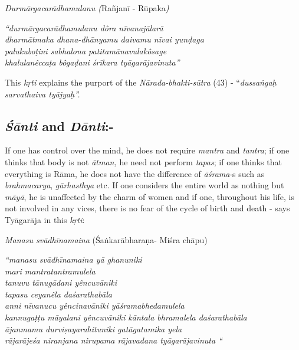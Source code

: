 \textit{Durmārgacarādhamulanu (}Rañjanī - Rūpaka\textit{)}

\begin{longquote}
\textit{“durmārgacarādhamulanu dôra nīvanajālarā}\\ \textit{dharmātmaka dhana-dhānyamu daivamu nīvai yunḍaga}\\ \textit{palukuboṭini sabhalona patitamānavulakôsage}\\ \textit{khalulanêccaṭa bôgaḍani śrīkara tyāgarājavinuta”}
\end{longquote}

This \textit{kṛti} explains the purport of the \textit{Nārada-bhakti-sūtra} (43) - “\textit{dussaṅgaḥ sarvathaiva tyājyaḥ”.}

\vspace{-.3cm}

\subsection*{\textit{Śānti} and \textit{Dānti}:-}

\vspace{-.3cm}

If one has control over the mind, he does not require \textit{mantra} and \textit{tantra}; if one thinks that body is not \textit{ātman,} he need not perform \textit{tapas}; if one thinks that everything is Rāma, he does not have the difference of \textit{āśrama}-s such as \textit{brahmacarya}, \textit{gārhasthya} etc. If one considers the entire world as nothing but \textit{māyā}, he is unaffected by the charm of women and if one, throughout his life, is not involved in any vices, there is no fear of the cycle of birth and death - says Tyāgarāja in this \textit{kṛti}:

\textit{Manasu svādhīnamaina} (Śaṅkarābharaṇa- Miśra chāpu)

\begin{longquote}
\textit{“manasu svādhīnamaina yā ghanuniki}\\ \textit{mari mantratantramulela}\\\textit{tanuvu tānugādani yêncuvāniki}\\\textit{tapasu ceyanêla daśarathabāla}\\ \textit{anni nīvanucu yêncinavāniki yāśramabhedamulela}\\ \textit{kannugaṭṭu māyalani yêncuvāniki kāntala bhramalela daśarathabāla}\\ \textit{ājanmamu durviṣayarahituniki gatāgatamika yela}\\ \textit{rājarājeśa niranjana nirupama rājavadana tyāgarājavinuta “}
\end{longquote}

